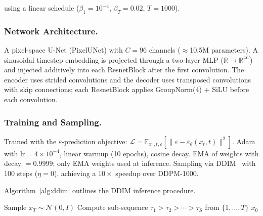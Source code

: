 \documentclass[runningheads]{llncs}
\begin{document}
using a linear schedule ($\beta_1=10^{-4}$, $\beta_T=0.02$, $T=1000$).

\subsubsection{Network Architecture.}

A pixel-space U-Net (PixelUNet) with $C=96$ channels ($\approx$10.5M parameters). A sinusoidal timestep embedding is projected through a two-layer MLP ($\mathbb{R} \to \mathbb{R}^{4C}$) and injected additively into each ResnetBlock after the first convolution. The encoder uses strided convolutions and the decoder uses transposed convolutions with skip connections; each ResnetBlock applies GroupNorm(4) + SiLU before each convolution.

\subsubsection{Training and Sampling.}

Trained with the $\varepsilon$-prediction objective:
$\mathcal{L} = \mathbb{E}_{x_0,t,\varepsilon}\!\left[\|\varepsilon - \varepsilon_\theta(x_t,t)\|^2\right]$.
Adam with lr$=4{\times}10^{-4}$, linear warmup (10 epochs), cosine decay.
EMA of weights with decay $=0.9999$; only EMA weights used at inference.
Sampling via DDIM~\cite{song2020} with 100 steps ($\eta=0$), achieving a
$10{\times}$ speedup over DDPM-1000.

Algorithm~\ref{alg:ddim} outlines the DDIM inference procedure.

\begin{algorithm}[htbp]
\DontPrintSemicolon
\SetAlgoLined
{}
Sample $x_T \sim \mathcal{N}(0,I)$\;
Compute sub-sequence $\tau_1 > \tau_2 > \cdots > \tau_S$ from $\{1,\ldots,T\}$\;
\Return $x_0$\;
\caption{DDIM Sampling ($\eta=0$ gives deterministic generation)}
\label{alg:ddim}
\end{algorithm}
\end{document}

